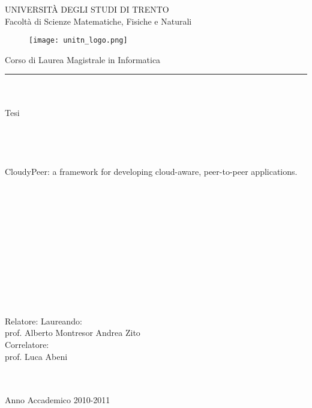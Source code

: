 \documentclass [11pt, a4paper]{report}
\begin{document}


\begin{titlepage}
\begin{center}
\LARGE
UNIVERSIT\`A DEGLI STUDI DI TRENTO\\
\large
Facolt\`a di Scienze Matematiche, Fisiche e Naturali\\
\begin{figure}[htbp]
\centering
\texttt{[image: unitn\_logo.png]}
\end{figure}
\large
Corso di Laurea Magistrale in Informatica\\
\rule{\linewidth}{0.5mm}
\ \\ \ \\
Tesi\\
\ \\ \ \\ \ \\ \ \\
\Large
CloudyPeer: a framework for developing cloud-aware, peer-to-peer
applications.
\end{center}

\ \\ \ \\ \ \\ \ \\ \ \\ \ \\ \ \\ \ \\ \ \\ \ \\ \ \\
\large
\flushleft \large Relatore:  \large Laureando:\\
\large prof. Alberto Montresor    \large Andrea Zito\\
\flushleft \large Correlatore:\\
\large prof. Luca Abeni
\normalsize
\ \\ \ \\ \ \\
\begin{center}
 Anno Accademico 2010-2011
\end{center}
\end{titlepage}

\tableofcontents








{}

\end{document}
